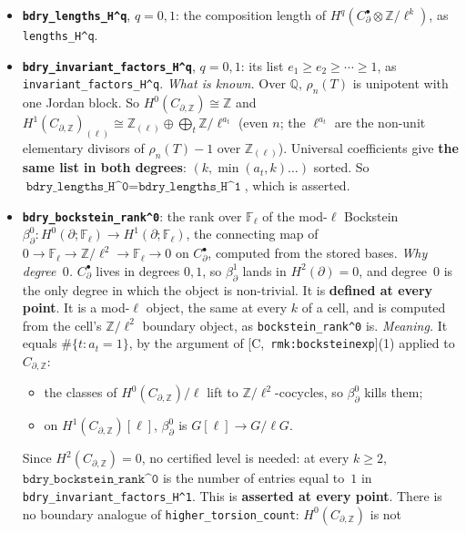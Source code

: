 \documentclass[11pt]{article}
\theoremstyle{remark}
\newcommand{\F}{\mathbb{F}}
\newcommand{\Z}{\mathbb{Z}}
\newcommand{\Q}{\mathbb{Q}}
\newcommand{\Fl}{\F_\ell}
\newcommand{\HA}[1]{[C,~\texttt{#1}]}      %
\begin{document}
\begin{itemize}
\item \textbf{\texttt{bdry\_lengths\_H\textasciicircum q}}, $q=0,1$: the composition length of
  $H^q(C^{\bullet}_{\partial}\otimes\Z/\ell^k)$, as \texttt{lengths\_H\textasciicircum q}.
\item \textbf{\texttt{bdry\_invariant\_factors\_H\textasciicircum q}}, $q=0,1$: its list
  $e_1\ge e_2\ge\cdots\ge1$, as \texttt{invariant\_factors\_H\textasciicircum q}.
  \emph{What is known.} Over $\Q$, $\rho_n(T)$ is unipotent with one Jordan block. So
  $H^0(C_{\partial,\Z})\cong\Z$ and $H^1(C_{\partial,\Z})_{(\ell)}\cong\Z_{(\ell)}\oplus\bigoplus_t\Z/\ell^{a_t}$
  (even $n$; the $\ell^{a_t}$ are the non-unit elementary divisors of $\rho_n(T)-1$ over
  $\Z_{(\ell)}$). Universal coefficients give \textbf{the same list in both degrees}:
  $(k,\min(a_t,k)\ldots)$ sorted. So $\texttt{bdry\_lengths\_H\textasciicircum0}=
  \texttt{bdry\_lengths\_H\textasciicircum1}$, which is asserted.
\item \textbf{\texttt{bdry\_bockstein\_rank\textasciicircum0}}: the rank over $\Fl$ of the mod-$\ell$
  Bockstein $\beta^0_{\partial}\colon H^0(\partial;\Fl)\to H^1(\partial;\Fl)$, the connecting map of
  $0\to\Fl\to\Z/\ell^2\to\Fl\to0$ on $C^{\bullet}_{\partial}$, computed from the stored bases.
  \emph{Why degree~$0$.} $C^{\bullet}_{\partial}$ lives in degrees $0,1$, so $\beta^1_{\partial}$
  lands in $H^2(\partial)=0$, and degree~$0$ is the only degree in which the object is non-trivial.
  It is \textbf{defined at every point}. It is a mod-$\ell$ object, the same at every $k$ of a
  cell, and is computed from the cell's $\Z/\ell^2$ boundary object, as
  \texttt{bockstein\_rank\textasciicircum0} is.
  \emph{Meaning.} It equals $\#\{t:a_t=1\}$, by the argument of \HA{rmk:bocksteinexp}(1) applied
  to $C_{\partial,\Z}$:
  \begin{itemize}
  \item the classes of $H^0(C_{\partial,\Z})/\ell$ lift to $\Z/\ell^2$-cocycles, so
    $\beta^0_{\partial}$ kills them;
  \item on $H^1(C_{\partial,\Z})[\ell]$, $\beta^0_{\partial}$ is $G[\ell]\to G/\ell G$.
  \end{itemize}
  Since $H^2(C_{\partial,\Z})=0$, no certified level is needed: at every $k\ge2$,
  $\texttt{bdry\_bockstein\_rank\textasciicircum0}$ is the number of entries equal to~$1$ in
  \texttt{bdry\_invariant\_factors\_H\textasciicircum1}. This is \textbf{asserted at every point}.
  There is no boundary analogue of \texttt{higher\_torsion\_count}: $H^0(C_{\partial,\Z})$ is not

\end{itemize}
\end{document}
